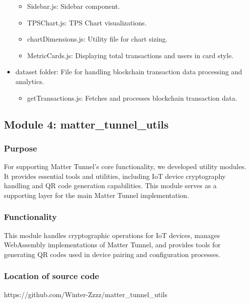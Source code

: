 \documentclass[conference]{IEEEtran}
\begin{document}
\begin{itemize}
\begin{itemize}
	      	\item Sidebar.js: Sidebar component.
	      	\item TPSChart.js: TPS Chart visualizations.
	      	\item chartDimensions.js: Utility file for chart sizing.
	      	\item MetricCards.js: Displaying total transactions and users in card style.
	      \end{itemize}
	\item dataset folder: File for handling blockchain transaction data processing and analytics.
	      \begin{itemize}
	      	\item getTransactions.js: Fetches and processes blockchain transaction data.
	      \end{itemize}
\end{itemize}

\subsection{Module 4: matter\_tunnel\_utils}

\subsubsection{Purpose}
For supporting Matter Tunnel's core functionality, we developed utility modules. It provides essential tools and utilities, including IoT device cryptography handling and QR code generation capabilities. This module serves as a supporting layer for the main Matter Tunnel implementation.

\subsubsection{Functionality}
This module handles cryptographic operations for IoT devices, manages WebAssembly implementations of Matter Tunnel, and provides tools for generating QR codes used in device pairing and configuration processes.

\subsubsection{Location of source code}
https://github.com/Winter-Zzzz/matter\_tunnel\_utils
\end{document}
